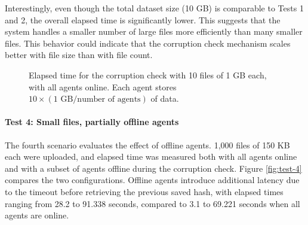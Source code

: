 Interestingly, even though the total dataset size (10 GB) is comparable to
Tests 1 and 2, the overall elapsed time is significantly lower. This suggests
that the system handles a smaller number of large files more efficiently than
many smaller files. This behavior could indicate that the corruption check mechanism scales better with file size than with file count.

\begin{figure}[!ht]
\centering
{}
\caption{Elapsed time for the corruption check with 10 files of 1 GB each, with all agents online. Each agent stores $10 \times (1 \text{ GB} / \text{number of agents})$ of data.}
\label{fig:test-3}
\end{figure}
\newpage
\paragraph{Test 4: Small files, partially offline agents}

The fourth scenario evaluates the effect of offline agents. 1,000 files of 150 KB
each were uploaded, and elapsed time was measured both with all agents online
and with a subset of agents offline during the corruption check.
Figure \ref{fig:test-4} compares the two configurations. Offline agents
introduce additional latency due to the timeout before retrieving the previous
saved hash, with elapsed times ranging from 28.2 to 91.338 seconds, compared to 3.1 to 69.221 seconds when all agents are online.

